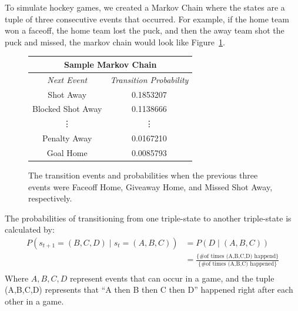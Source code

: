 \documentclass[11pt]{article}
\begin{document}
To simulate hockey games, we created a Markov Chain where the states are a tuple of three consecutive
events that occurred. For example, if the home team won a faceoff, the home team lost the puck, and 
then the away team shot the puck and missed, the markov chain would look like Figure~\ref{fig:markov_chain_sample}.

\begin{figure}
    \centering
    \begin{tabular}{ |c|c| } 
    \hline
        \multicolumn{2}{|c|}{\textbf{Sample Markov Chain}} \\
     \hline
     \textit{Next Event} & \textit{Transition Probability} \\ 
     \hline
     Shot Away & 0.1853207 \\ 
     \hline
     Blocked Shot Away & 0.1138666 \\ 
     \hline
     \vdots & \vdots \\
    \hline
    Penalty Away & 0.0167210 \\
    \hline
    Goal Home & 0.0085793 \\
    \hline
    \end{tabular}
    \caption{The transition events and probabilities when the previous three events were Faceoff Home, Giveaway Home, and Missed
    Shot Away, respectively.}
    \label{fig:markov_chain_sample}
\end{figure}


The probabilities of transitioning from one triple-state to another triple-state is calculated by:
\begin{align*}
    P(s_{t+1} = (B,C,D) \;|\; s_t = (A,B,C)) &= P(D \;|\; (A,B,C)) \\
    &= \frac{\{ \text{\# of times (A,B,C,D) happend}\}}{\{ \text{\# of times (A,B,C) happened}\}} \\
\end{align*}
Where $A,B,C,D$ represent events that can occur in a game, and the tuple (A,B,C,D) represents that ``A then 
B then C then D'' happened right after each other in a game.
\end{document}

